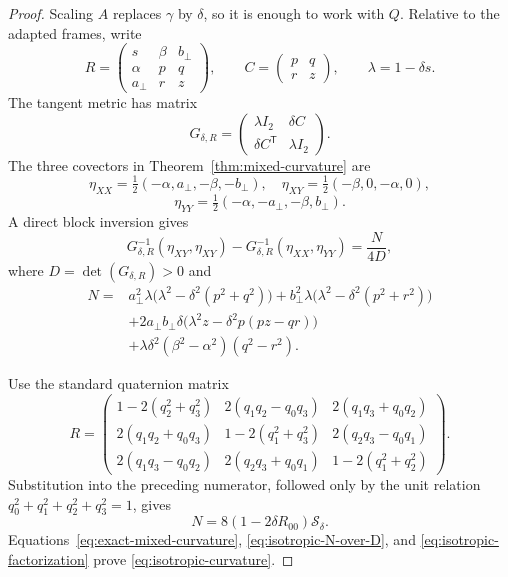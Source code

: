 \documentclass[11pt]{amsart}
\theoremstyle{definition}
\theoremstyle{remark}
\begin{document}
\begin{proof}
Scaling $A$ replaces $\gamma$ by $\delta$, so it is enough to work
with $Q$.  Relative to the adapted frames, write
\[
 R=\begin{pmatrix}
 s&\beta&b_\perp\\
 \alpha&p&q\\
 a_\perp&r&z
 \end{pmatrix},
 \qquad
 C=\begin{pmatrix}p&q\\r&z\end{pmatrix},
 \qquad \lambda=1-\delta s.
\]
The tangent metric has matrix
\begin{equation}\label{eq:isotropic-G}
 G_{\delta,R}=
 \begin{pmatrix}\lambda I_2&\delta C\\
                 \delta C^{\mathsf T}&\lambda I_2
 \end{pmatrix}.
\end{equation}
The three covectors in Theorem~\ref{thm:mixed-curvature} are
\[
 \eta_{XX}=\tfrac12(-\alpha,a_\perp,-\beta,-b_\perp),\quad
 \eta_{XY}=\tfrac12(-\beta,0,-\alpha,0),
\]
\[
 \eta_{YY}=\tfrac12(-\alpha,-a_\perp,-\beta,b_\perp).
\]
A direct block inversion gives
\begin{equation}\label{eq:isotropic-N-over-D}
 G_{\delta,R}^{-1}(\eta_{XY},\eta_{XY})
 -G_{\delta,R}^{-1}(\eta_{XX},\eta_{YY})
 =\frac{N}{4D},
\end{equation}
where $D=\det(G_{\delta,R})>0$ and
\begin{align*}
 N={}&a_\perp^2\lambda
       \bigl(\lambda^2-\delta^2(p^2+q^2)\bigr)
 +b_\perp^2\lambda
       \bigl(\lambda^2-\delta^2(p^2+r^2)\bigr)\\
 &+2a_\perp b_\perp\delta
       \bigl(\lambda^2z-\delta^2p(pz-qr)\bigr)\\
 &+\lambda\delta^2(\beta^2-\alpha^2)(q^2-r^2).
\end{align*}

Use the standard quaternion matrix
\[
 R=\begin{pmatrix}
 1-2(q_2^2+q_3^2)&2(q_1q_2-q_0q_3)&2(q_1q_3+q_0q_2)\\
 2(q_1q_2+q_0q_3)&1-2(q_1^2+q_3^2)&2(q_2q_3-q_0q_1)\\
 2(q_1q_3-q_0q_2)&2(q_2q_3+q_0q_1)&1-2(q_1^2+q_2^2)
 \end{pmatrix}.
\]
Substitution into the preceding numerator, followed only by the unit
relation $q_0^2+q_1^2+q_2^2+q_3^2=1$, gives
\begin{equation}\label{eq:isotropic-factorization}
 N=8(1-2\delta R_{00})\mathcal S_\delta.
\end{equation}
Equations~\eqref{eq:exact-mixed-curvature},
\eqref{eq:isotropic-N-over-D}, and
\eqref{eq:isotropic-factorization} prove
\eqref{eq:isotropic-curvature}.


\end{proof}
\end{document}
